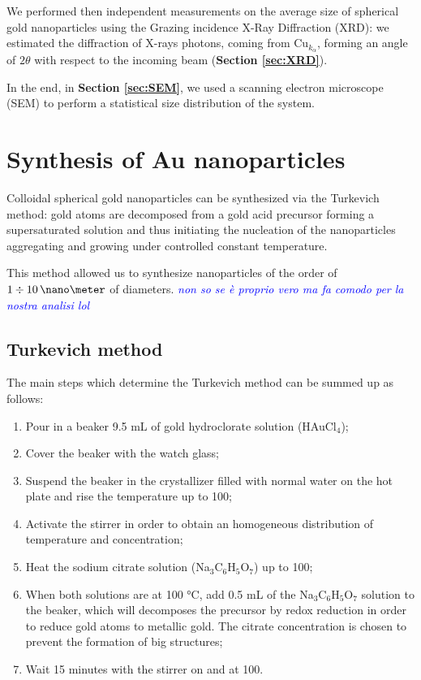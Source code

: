 \documentclass[twocolumn]{article}
\newcommand{\gio}[1]{\textcolor{blue}{\textit{#1}}}
\begin{document}
\begin{multicols}{2}
We performed then independent measurements on the average size of spherical gold nanoparticles using the Grazing incidence X-Ray Diffraction (XRD): we estimated the diffraction of X-rays photons, coming from \(\text{Cu}_{k_\alpha}\), forming an angle of \(2\theta\) with respect to the incoming beam (\textbf{Section \ref{sec:XRD}}).

In the end, in \textbf{Section \ref{sec:SEM}}, we used a scanning electron microscope (SEM) to perform a statistical size distribution of the system.


\section{Synthesis of Au nanoparticles}
\label{sec:synthesis}
\noindent
Colloidal spherical gold nanoparticles can be synthesized via the Turkevich method: gold atoms are decomposed from a gold acid precursor forming a supersaturated solution and thus initiating the nucleation of the nanoparticles aggregating and growing under controlled constant temperature.

This method allowed us to synthesize nanoparticles of the order of $1 \div 10 \,\nano\meter$ of diameters. \gio{non so se è proprio vero ma fa comodo per la nostra analisi lol}

\subsection{Turkevich method}
The main steps which determine the Turkevich method can be summed up as follows:

\begin{enumerate}
    \item Pour in a beaker 9.5 mL of gold hydroclorate solution (HAuCl$_4$);
    \item Cover the beaker with the watch glass;
    \item Suspend the beaker in the crystallizer filled with normal water on the hot plate and rise the temperature up to 100\degreecelsius;
    \item Activate the stirrer in order to obtain an homogeneous distribution of temperature and concentration;
    \item Heat the sodium citrate solution (Na$_3$C$_6$H$_5$O$_7$) up to 100\degreecelsius;
    \item When both solutions are at 100 °C, add 0.5 mL of the Na$_3$C$_6$H$_5$O$_7$ solution to the beaker, which will decomposes the precursor by redox reduction in order to reduce gold atoms to metallic gold. The citrate concentration is chosen to prevent the formation of big structures;
    \item Wait 15 minutes with the stirrer on and at 100\degreecelsius.
\end{enumerate}


\end{multicols}
\end{document}
